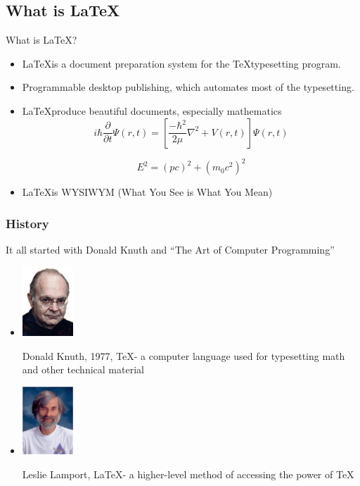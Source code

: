 \documentclass[10pt,times]{beamer}
\begin{document}
\subsection{What is \LaTeX}
\begin{frame}{What is \LaTeX?}
\begin{itemize}
\item \LaTeX is a document preparation system for the \TeX typesetting 
program. 

\item Programmable desktop publishing, which automates most of the typesetting.

\item \LaTeX produce beautiful documents, especially mathematics
\begin{equation*}
i \hbar \frac{\partial}{\partial t} \Psi(r,t) = 
\left[\frac{-\hbar^2}{2\mu}\nabla^2+V(r,t)\right]\Psi(r,t)
\end{equation*}

\begin{equation*}
E^2 = (pc)^2 + (m_0 c^2)^2
\end{equation*}

\item \LaTeX is WYSIWYM (What You See is What You Mean)

\end{itemize}
\end{frame}


\begin{frame}
\frametitle{History}
It all started with Donald Knuth and ``The Art of Computer Programming'' 
\begin{itemize}
\item
\parbox{0.25\textwidth}{
	\includegraphics[width=0.15\textwidth]{figs/Donald_Knuth.png}}
\parbox{0.65\textwidth}{Donald Knuth, 1977, \TeX - a computer language used for 
typesetting math and other technical material}

\item
\parbox{0.25\textwidth}{\includegraphics[width=0.15\textwidth]{figs/Leslie.png}}
\parbox{0.65\textwidth}{Leslie Lamport, \LaTeX - a higher-level method of 
accessing the power of \TeX}
\end{itemize}
\end{frame}
\end{document}
